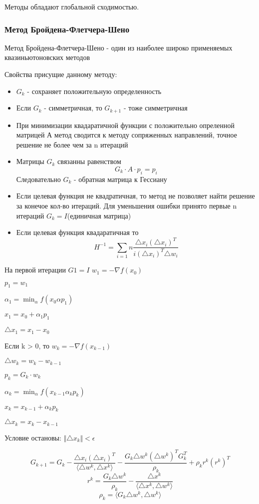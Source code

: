 \documentclass[a4paper, 14pt]{article}
\begin{document}
Методы обладают глобальной сходимостью.

\subsubsection*{Метод Бройдена-Флетчера-Шено}
Метод Бройдена-Флетчера-Шено - один из наиболее широко применяемых квазиньютоновских методов

Свойства присущие данному методу:

\begin{itemize}
	\item  $G_k$ - сохраняет положительную определенность
	\item Если $G_k$ - симметричная, то $G_{k+1}$ - тоже симметричная
	\item При минимизации квадаратичной функции с положительно опреленной матрицей А метод сводится к методу сопряженных направлений, точное решение не более чем за n итераций
	\item Матрицы $G_k$ связанны равенством
	\[
	G_k \cdot A \cdot p_i = p_i\]
	Следовательно $G_k$ - обратная матрица к Гессиану
	\item Если целевая функция не квадратичная, то метод не позволяет найти решение за конечое кол-во итераций. Для уменьшения ошибки принято первые n итераций $G_k = I$(единичная матрица)
	\item Если целевая функция  квадаратичная то
	\[
	H^{-1} = \sum_{i = 1} n\frac{\triangle x_i(\triangle x_i)^T}{i(\triangle x_i)^T \triangle w_i} \]
\end{itemize}

На первой итерации $G1 = I$
$w_1 =  - \nabla f(x_0)$

$p_1 = w_1$

$\alpha_1 = \min_\alpha f(x_0 \alpha p_1)$

$x_1 = x_0 + \alpha_1 p_1$

$\triangle x_1 = x_1 - x_0$

 Если k > 0, то
$w_k =  - \nabla f(x_{k - 1})$

$\triangle  w_k = w_k - w_{k-1}$

$p_k = G_k \cdot w_k$

$\alpha_k = \min_\alpha f(x_{k - 1} \alpha_k p_k)$

$x_k = x_{k-1} + \alpha_k p_k$

$\triangle x_k = x_k - x_{k - 1}$

Условие остановы: $\Vert \triangle x_k \Vert < \epsilon$

\[G_{k+1} = G_k - \frac{\triangle x_i(\triangle x_i)^T}{\langle \triangle w^k, \triangle x^k\rangle} - \frac{G_k \triangle w^k (\triangle w^k)^T G_k^T}{\rho_k} + \rho_k r^k (r^k)^T\]
\[
r^k = \frac{G_k \triangle w^k}{\rho_k} - \frac{\triangle x^k}{\langle \triangle x^k, \triangle w^k \rangle}\]
\[
\rho_k = \langle G_k \triangle w^k, \triangle w^k \rangle\]
\end{document}

